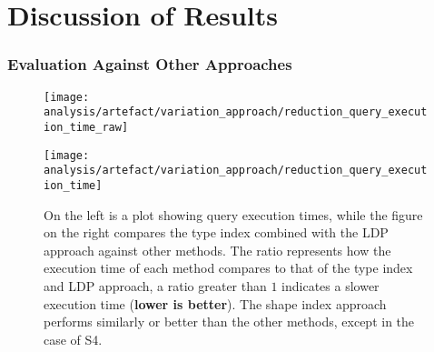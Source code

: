 \section{Discussion of Results}\label{sec:result}

\subsubsection{Evaluation Against Other Approaches}

\begin{figure}
    \centering
    \begin{minipage}[t]{0.40\linewidth}
        \centering
        \texttt{[image: analysis/artefact/variation\_approach/reduction\_query\_execution\_time\_raw]}
    \end{minipage}
    \hspace{0.05\textwidth}
    \begin{minipage}[t]{0.40\linewidth}
        \centering
        \texttt{[image: analysis/artefact/variation\_approach/reduction\_query\_execution\_time]}
    \end{minipage}

    \caption{
    On the left is a plot showing query execution times, while the figure on the right compares the type index combined with the LDP approach against other methods.
    The ratio represents how the execution time of each method compares to that of the type index and LDP approach, a ratio greater than $1$ indicates a slower execution time (\textbf{lower is better}).
    The shape index approach performs similarly or better than the other methods, except in the case of S4.
    }
    \label{fig:compApproach}
\end{figure}

%


